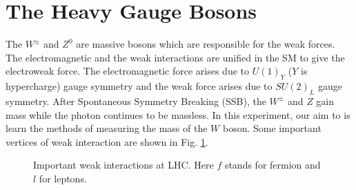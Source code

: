 \documentclass[a4paper]{report}
\numberwithin{equation}{section}
\begin{document}
\section{The Heavy Gauge Bosons} \label{sec:gauge_bosons}

The $W^{\pm}$ and $Z^0$ are massive bosons which are responsible for the weak forces. The electromagnetic and the weak interactions are unified in the SM to give the electroweak force. The electromagnetic force arises due to $U(1)_{Y}$ ($Y$ is hypercharge) gauge symmetry and the weak force arises due to $SU(2)_L$ gauge symmetry. After Spontaneous Symmetry Breaking (SSB), the $W^{\pm}$ and $Z$ gain mass while the photon continues to be massless. In this experiment, our aim to is learn the methods of measuring the mass of the $W$ boson. Some important vertices of weak interaction are shown in Fig. \ref{fig:weak_int}.

\begin{figure}[htb!]
	\centering
	\quad
	\centering
	\quad
	\centering
	\caption{Important weak interactions at LHC. Here $f$ stands for fermion and $l$ for leptons.}
	\label{fig:weak_int}
\end{figure}
\end{document}
